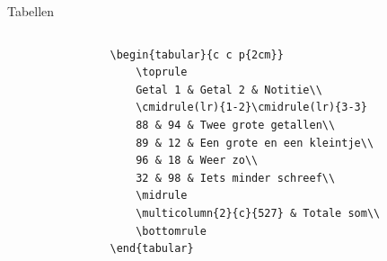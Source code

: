 \copyrightVincent

\begin{frame}[fragile]{Tabellen}
    \begin{columns}
        \begin{column}{0.5\textwidth}
            \begin{verbatim}
                \begin{tabular}{c c p{2cm}}
                    \toprule
                    Getal 1 & Getal 2 & Notitie\\
                    \cmidrule(lr){1-2}\cmidrule(lr){3-3}
                    88 & 94 & Twee grote getallen\\
                    89 & 12 & Een grote en een kleintje\\
                    96 & 18 & Weer zo\\
                    32 & 98 & Iets minder schreef\\
                    \midrule
                    \multicolumn{2}{c}{527} & Totale som\\
                    \bottomrule
                \end{tabular}
            \end{verbatim}
        \end{column}
        \begin{column}{0.5\textwidth}
        \end{column}
    \end{columns}
\end{frame}


